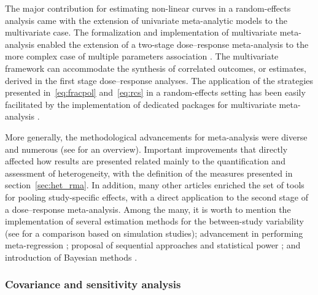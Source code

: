 \documentclass[11pt,a4paper,twoside,openany]{book}\usepackage{knitr}
\begin{document}
{The major contribution for estimating non-linear curves in a random-effects analysis came with the extension of univariate meta-analytic models to the multivariate case. The formalization and implementation of multivariate meta-analysis enabled the extension of a two-stage dose--response meta-analysis to the more complex case of multiple parameters association \citep{gasparrini2012multivariate}. The multivariate framework can accommodate the synthesis of correlated outcomes, or estimates, derived in the first stage dose--response analyses. The application of the strategies presented in~\ref{eq:fracpol} and~\ref{eq:rcs} in a random-effects setting has been easily facilitated by the implementation of dedicated packages for multivariate meta-analysis \citep{white2011multivariate, jackson2011multivariate}.

\noindent More generally, the methodological advancements for meta-analysis were diverse and numerous (see \cite{sutton2008recent} for an overview). Important improvements that directly affected how results are presented related mainly to the quantification and assessment of heterogeneity, with the definition of the measures presented in section~\ref{sec:het_rma}. In addition, many other articles enriched the set of tools for pooling study-specific effects, with a direct application to the second stage of a dose--response meta-analysis. Among the many, it is worth to mention the implementation of several estimation methods for the between-study variability (see \cite{langan2017comparative} for a comparison based on simulation studies); advancement in performing meta-regression \citep{van2002advanced}; proposal of sequential approaches \citep{pogue1997cumulating} and statistical power \citep{sutton2007evidence}; and introduction of Bayesian methods \citep{sutton2001bayesian}.

\subsubsection*{Covariance and sensitivity analysis}

}
\end{document}
